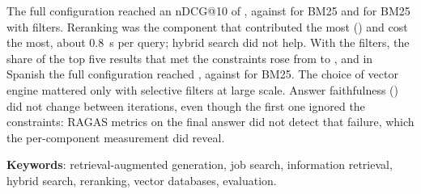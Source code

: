 The full configuration reached an nDCG@10 of \cNdcgCompletaEn, against \cNdcgBMEn{} for BM25 and \cNdcgBMFiltrosEn{} for BM25 with filters. Reranking was the component that contributed the most (\cDifReordEnTres) and cost the most, about 0.8~s per query; hybrid search did not help. With the filters, the share of the top five results that met the constraints rose from \cCumplDensoEn{} to \cCumplFiltrosEn, and in Spanish the full configuration reached \cNdcgCompletaEsEn, against \cNdcgBMEsEn{} for BM25. The choice of vector engine mattered only with selective filters at large scale. Answer faithfulness (\cFidelidadEn) did not change between iterations, even though the first one ignored the constraints: RAGAS metrics on the final answer did not detect that failure, which the per-component measurement did reveal.

\textbf{Keywords}: retrieval-augmented generation, job search, information retrieval, hybrid search, reranking, vector databases, evaluation.
